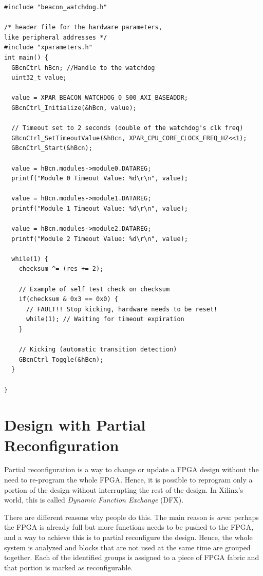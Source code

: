 \begin{lstlisting}[style=C]
#include "beacon_watchdog.h"

/* header file for the hardware parameters, 
like peripheral addresses */
#include "xparameters.h" 
int main() {
  GBcnCtrl hBcn; //Handle to the watchdog
  uint32_t value;

  value = XPAR_BEACON_WATCHDOG_0_S00_AXI_BASEADDR;
  GBcnCtrl_Initialize(&hBcn, value);

  // Timeout set to 2 seconds (double of the watchdog's clk freq)
  GBcnCtrl_SetTimeoutValue(&hBcn, XPAR_CPU_CORE_CLOCK_FREQ_HZ<<1);
  GBcnCtrl_Start(&hBcn);

  value = hBcn.modules->module0.DATAREG;
  printf("Module 0 Timeout Value: %d\r\n", value);

  value = hBcn.modules->module1.DATAREG;
  printf("Module 1 Timeout Value: %d\r\n", value);

  value = hBcn.modules->module2.DATAREG;
  printf("Module 2 Timeout Value: %d\r\n", value);

  while(1) {
    checksum ^= (res += 2);

    // Example of self test check on checksum
    if(checksum & 0x3 == 0x0) {
      // FAULT!! Stop kicking, hardware needs to be reset!
      while(1); // Waiting for timeout expiration
    }

    // Kicking (automatic transition detection)
    GBcnCtrl_Toggle(&hBcn); 
  }

}
\end{lstlisting}



\section{Design with Partial Reconfiguration}

Partial reconfiguration is a way to change or update a FPGA design without the need to re-program the whole FPGA. Hence, it is possible to reprogram only a portion of the design without interrupting the rest of the design. In Xilinx's world, this is called \textit{Dynamic Function Exchange} (DFX).\bigskip 

There are different reasons why people do this. The main reason is \textit{area}: perhaps the FPGA is already full but more functions needs to be pushed to the FPGA, and a way to achieve this is to partial reconfigure the design. Hence, the whole system is analyzed and blocks that are not used at the same time are grouped together. Each of the identified groups is assigned to a piece of FPGA fabric and that portion is marked as reconfigurable. 

